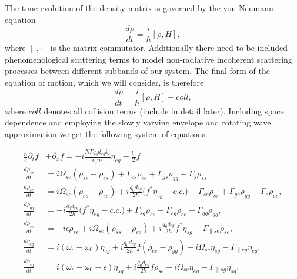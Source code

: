 \documentclass[twocolumn,secnumarabic,amssymb, nobibnotes, aps, prd]{revtex4-1}
\begin{document}
The time evolution of the density matrix is governed by the von Neumann equation
\begin{equation}
\frac{d \rho}{dt} = \frac{i}{\hbar} [\rho,H],
\end{equation}
where $[\cdot,\cdot]$ is the matrix commutator. Additionally there need to be included phenomenological scattering terms to model non-radiative incoherent scattering processes between different subbands of our system. The final form of the equation of motion, which we will consider, is therefore
\begin{equation}
\frac{d \rho}{dt} = \frac{i}{\hbar} [\rho,H] + coll,  
\end{equation}
where $coll$ denotes all collision terms (include in detail later). Including space dependence and employing the slowly varying envelope and rotating wave approximation we get the following system of equations
\begin{center}
\begin{widetext}
\begin{subequations}
	\label{eq:threelevelmodel}
	\begin{align}
	 \frac{n}{c}\partial_t f &+ \partial_{x}f= -i\frac{N \Gamma q_0d_{eg} k_c}{\epsilon_0 n^2} \eta_{eg} - \frac{l_0}{2} f \label{eq:rtwave} \\
		\frac{d \rho_{ss}}{d t} 	&= i\Omega_{se} (\rho_{se} - \rho_{es})+ \Gamma_{es}\rho_{ee} + \Gamma_{gs}\rho_{gg}  -\Gamma_s\rho_{ss} \\
		\frac{d \rho_{ee}}{d t}	& = i\Omega_{se} (\rho_{es} - \rho_{se}) + i\frac{q_0d_{eg}}{2\hbar} \big (f^*\eta_{eg}- c.c. \big ) 
		 +\Gamma_{se}\rho_{ss} + \Gamma_{ge}\rho_{gg} - \Gamma_e \rho_{ee},  \\
		\frac{d \rho_{gg}}{d t}  &= -i\frac{q_0d_{eg}}{2\hbar} \big (f^*\eta_{eg} - c.c. \big )  + \Gamma_{sg}\rho_{ss}  +  \Gamma_{eg}\rho_{ee} - \Gamma_{gg}\rho_{gg} , \\
		\frac{d \rho_{se}}{d t}  &= -i\epsilon\rho_{se} +i \Omega_{se}(\rho_{ss} - \rho_{ee}) +i\frac{q_0d_{eg}}{2 \hbar}f^*\eta_{sg}- \Gamma_{\parallel se} \rho_{se},  \\
		\frac{d \eta_{eg}}{d t}   &= i(\omega_c - \omega_0)\eta_{eg} + i \frac{q_0d_{eg}}{2\hbar}f(\rho_{ee}-\rho_{gg})  - i\Omega_{se}\eta_{sg} - \Gamma_{\parallel eg}\eta_{eg}, \\
		\frac{d \eta_{sg}}{d t} &= i(\omega_c - \omega_0-\epsilon)\eta_{sg} +i \frac{q_0d_{eg}}{2\hbar}f\rho_{se} - i\Omega_{se}\eta_{eg} - \Gamma_{\parallel sg}\eta_{sg}.
	\end{align}
\end{subequations}
\end{widetext}
\end{center}
\end{document}
